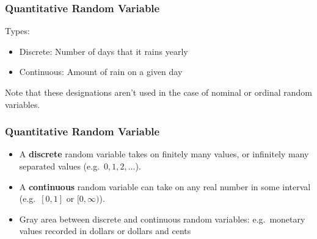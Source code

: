 %
%
%

\begin{frame}
\frametitle{ Quantitative Random Variable }
Types:
\begin{itemize}
\item Discrete: Number of days that it rains yearly 
\item Continuous:  Amount of rain on a given day 
\end{itemize}
Note that these designations aren't used in the case of nominal or
ordinal random variables.
\end{frame}

\begin{frame}
\frametitle{ Quantitative Random Variable }

\begin{itemize}
\item A {\bf discrete} random variable takes on finitely many values, or
infinitely many separated values (e.g.\ $0,1,2,\ldots$).

\item A {\bf continuous} random variable can take on any real number in some
interval (e.g.\ $[0,1]$ or $[0,\infty)$).  

\item Gray area between discrete and continuous random variables:
e.g.\ monetary values recorded in dollars or dollars and cents
\end{itemize}
\end{frame}

